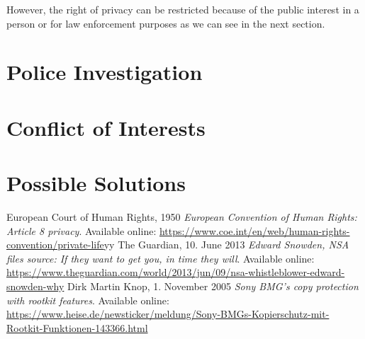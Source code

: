 \documentclass[a4paper, 11pt]{article}
\begin{document}
However, the right of privacy can be restricted because of the public interest in a person or for law enforcement purposes as we can see in the next section. 
\section*{Police Investigation}

\section*{Conflict of Interests}

\section*{Possible Solutions}

\begin{thebibliography}{9}
     European Court of Human Rights, 1950 \emph{European Convention of Human Rights: Article 8  privacy}. Available online: \href{https://www.coe.int/en/web/human-rights-convention/private-life}{https://www.coe.int/en/web/human-rights-convention/private-life}yy
     The Guardian, 10. June 2013 \emph{Edward Snowden, NSA files source: If they want to get you, in time they will}. Available online: \href{https://www.theguardian.com/world/2013/jun/09/nsa-whistleblower-edward-snowden-why}{https://www.theguardian.com/world/2013/jun/09/nsa-whistleblower-edward-snowden-why}
     Dirk Martin Knop, 1. November 2005 \emph{Sony BMG's copy protection with rootkit features}. Available online: \href{https://www.heise.de/newsticker/meldung/Sony-BMGs-Kopierschutz-mit-Rootkit-Funktionen-143366.html}{https://www.heise.de/newsticker/meldung/Sony-BMGs-Kopierschutz-mit-Rootkit-Funktionen-143366.html}
\end{thebibliography}
\end{document}
